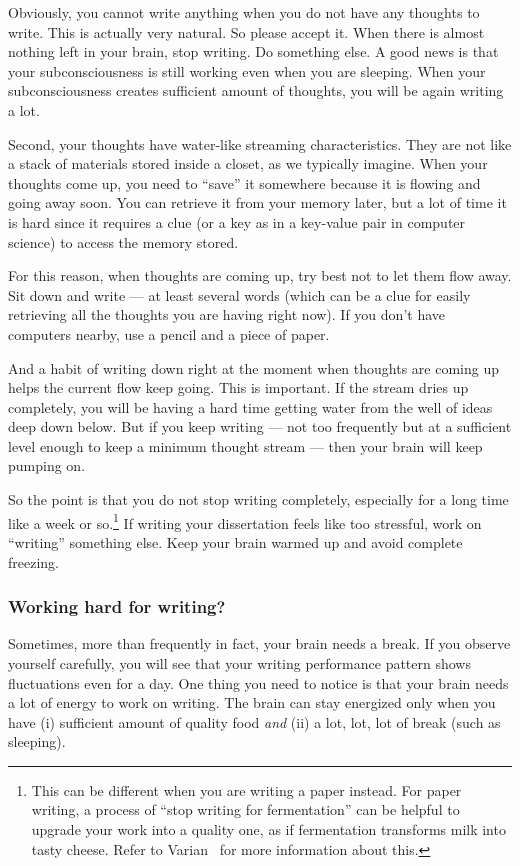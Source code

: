 \documentclass[11pt]{article}
\begin{document}
Obviously, you cannot write anything when you do not have any thoughts to
write. This is actually very natural. So please accept it. When there is
almost nothing left in your brain, stop writing. Do something else. A good
news is that your subconsciousness is still working even when you are
sleeping. When your subconsciousness creates sufficient amount of thoughts,
you will be again writing a lot. 

Second, your thoughts have water-like streaming characteristics.  They are not
like a stack of materials stored inside a closet, as we typically imagine.
When your thoughts come up, you need to ``save'' it somewhere because it is
flowing and going away soon. You can retrieve it from your memory later, but a
lot of time it is hard since it requires a clue (or a key as in a key-value
pair in computer science) to access the memory stored. 

For this reason, when thoughts are coming up, try best not to let them flow
away. Sit down and write --- at least several words (which can be a clue for
easily retrieving all the thoughts you are having right now). If you don't
have computers nearby, use a pencil and a piece of paper. 

And a habit of writing down right at the moment when thoughts are coming up
helps the current flow keep going. This is important. If the stream dries up
completely, you will be having a hard time getting water from the well of
ideas deep down below.  But if you keep writing --- not too frequently but at
a sufficient level enough to keep a minimum thought stream --- then your brain
will keep pumping on.

So the point is that you do not stop writing completely, especially for a long
time like a week or so.\footnote{This can be different when you are writing a
paper instead. For paper writing, a process of ``stop writing for
fermentation'' can be helpful to upgrade your work into a quality one, as if
fermentation transforms milk into tasty cheese. Refer to
Varian~\cite{varian-building-model} for more information about this.} If
writing your dissertation feels like too stressful, work on ``writing''
something else. Keep your brain warmed up and avoid complete freezing. 

\subsubsection{Working hard for writing?}

Sometimes, more than frequently in fact, your brain needs a break. If you
observe yourself carefully, you will see that your writing performance pattern
shows fluctuations even for a day. One thing you need to notice is that your
brain needs a lot of energy to work on writing. The brain can stay energized
only when you have (i) sufficient amount of quality food \emph{and} (ii) a
lot, lot, lot of break (such as sleeping). 
\end{document}
